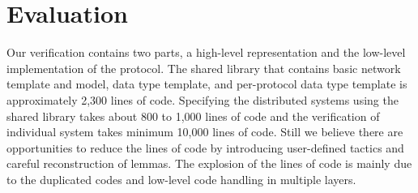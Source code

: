 
\section{Evaluation}
\label{chapter:witnesspassing:sec:evaluation}

Our verification contains two parts, a high-level representation and the low-level implementation of the protocol. 
The shared library that contains basic network template and model, 
data type template, and per-protocol data type template is approximately 2,300 lines of code. 
Specifying the distributed systems using the shared library takes about 800 to 1,000 lines of code
and the verification of individual system takes minimum 10,000 lines of code. 
Still we believe there are opportunities to reduce the lines of code by
introducing user-defined tactics and careful reconstruction of lemmas. 
The explosion of the lines of code is mainly due to
the duplicated codes and low-level code handling in multiple layers. 


 